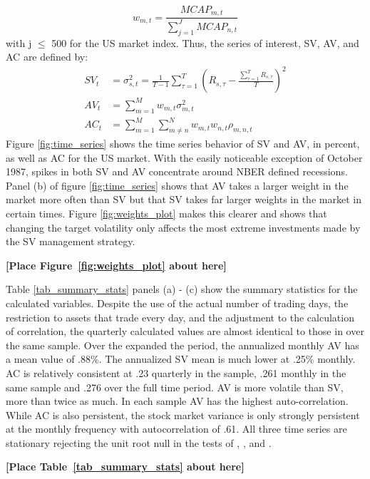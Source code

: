 \begin{equation}
w_{m,t} = \frac{MCAP_{m,t}}{\sum_{j=1}^{J}MCAP_{n,t}}
\end{equation}
with j $\leq$ 500 for the US market index. Thus, the series of interest, SV, AV, and AC are defined by:
\begin{align}
	SV_{t} &= \sigma^{2}_{s,t} = \frac{1}{T-1}\sum_{\tau = 1}^{T} \left(R_{s,\tau} - \frac{\sum_{\tau = 1}^{T} R_{s,\tau}}{T}\right)^{2}\\
	AV_{t} &= \sum_{m=1}^{M} w_{m,t}\sigma^{2}_{m,t}\\
	AC_{t} &= \sum_{m=1}^{M}\sum_{m \neq n}^{N}w_{m,t}w_{n,t}\rho_{m,n,t}
\end{align}
Figure \ref{fig:time_series} shows the time series behavior of SV and AV, in percent, as well as
AC for the US market. With the easily noticeable exception of October 1987, spikes in both SV and AV concentrate around NBER defined recessions. Panel (b) of figure \ref{fig:time_series} shows that AV takes a larger weight in the market more often than SV but that SV takes far larger weights in the market in certain times. Figure \ref{fig:weights_plot} makes this clearer and shows that changing the target volatility only affects the most extreme investments made by the SV management strategy.\\
\bigskip
\centerline{\bf [Place Figure~\ref{fig:weights_plot} about here]}
\bigskip

Table \ref{tab_summary_stats} panels (a) - (c) show the summary statistics for the calculated variables. Despite the use of the actual number of trading days, the restriction to assets that trade every day, and the adjustment to the calculation of correlation, the quarterly calculated values are almost identical to those in \citet{pollet_average_2010} over the same sample. Over the expanded the period, the annualized monthly AV has a mean value of .88\%. The annualized SV mean is much lower at .25\% monthly. AC is relatively consistent at .23 quarterly in the \cite{pollet_average_2010} sample, .261 monthly in the same sample and .276 over the full time period. AV is more volatile than SV, more than twice as much. In each sample AV has the highest auto-correlation. While AC is also persistent, the stock market variance is only strongly persistent at the monthly frequency with autocorrelation of .61. All three time series are stationary rejecting the unit root null in the tests of \citet{dickey_distribution_1979}, \citet{Ng2001}, and \citet{ers1996}. 
\bigskip
\centerline{\bf [Place Table~\ref{tab_summary_stats} about here]}
\bigskip

